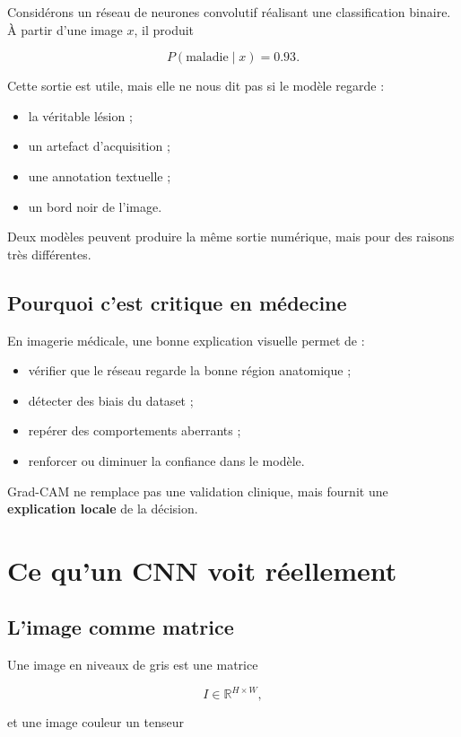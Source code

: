 ﻿\documentclass[11pt,a4paper]{article}
\begin{document}
Considérons un réseau de neurones convolutif réalisant une classification binaire. À partir d'une image $x$, il produit

\[
P(\text{maladie} \mid x)=0.93.
\]

Cette sortie est utile, mais elle ne nous dit pas si le modèle regarde :
\begin{itemize}
    \item la véritable lésion ;
    \item un artefact d'acquisition ;
    \item une annotation textuelle ;
    \item un bord noir de l'image.
\end{itemize}

Deux modèles peuvent produire la même sortie numérique, mais pour des raisons très différentes.

\subsection{Pourquoi c'est critique en médecine}

En imagerie médicale, une bonne explication visuelle permet de :
\begin{itemize}
    \item vérifier que le réseau regarde la bonne région anatomique ;
    \item détecter des biais du dataset ;
    \item repérer des comportements aberrants ;
    \item renforcer ou diminuer la confiance dans le modèle.
\end{itemize}

Grad-CAM ne remplace pas une validation clinique, mais fournit une \textbf{explication locale} de la décision.

\section{Ce qu'un CNN voit réellement}

\subsection{L'image comme matrice}

Une image en niveaux de gris est une matrice

\[
I \in \mathbb{R}^{H \times W},
\]

et une image couleur un tenseur
\end{document}
